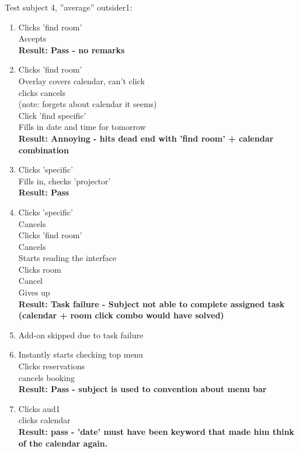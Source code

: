 Test subject 4, ''average'' outsider1:
\begin{enumerate}
\item Clicks 'find room' \\
Accepts \\
\textbf{Result: Pass - no remarks}
\item Clicks 'find room' \\
Overlay covers calendar, can't click \\
clicks cancels \\
(note: forgets about calendar it seems) \\
Click 'find specific' \\
Fills in date and time for tomorrow \\
\textbf{Result: Annoying - hits dead end with 'find room' + calendar combination}
\item Clicks 'specific' \\
Fills in, checks 'projector' \\
\textbf{Result: Pass}
\item Clicks 'specific' \\
Cancels \\
Clicks 'find room' \\
Cancels \\
Starts reading the interface \\
Clicks room \\
Cancel \\
Gives up \\
\textbf{Result: Task failure - Subject not able to complete assigned task (calendar + room click combo would have solved)}
\item Add-on skipped due to task failure
\item Instantly starts checking top menu \\
Clicks reservations \\
cancels booking \\
\textbf{Result: Pass - subject is used to convention about menu bar}
\item Clicks aud1 \\
clicks calendar \\
\textbf{Result: pass - 'date' must have been keyword that made him think of the calendar again. }
\end{enumerate}

